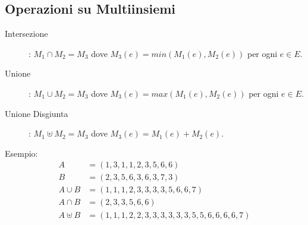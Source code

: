 \subsection{Operazioni su Multiinsiemi}
\begin{description}
    \item[Intersezione]: $M_1 \cap M_2 = M_3$ dove $M_3(e) = min(M_1(e),M_2(e))$ per ogni $e \in E$.
    \item[Unione]: $M_1 \cup M_2 = M_3$ dove $M_3(e) = max(M_1(e),M_2(e))$ per ogni $e \in E$.
    \item[Unione Disgiunta]: $M_1 \uplus M_2 = M_3$ dove $M_3(e) = M_1(e) + M_2(e)$.
\end{description}

Esempio:
\begin{equation*}
\begin{split}
A & = (1,3,1,1,2,3,5,6,6) \\
B & = (2,3,5,6,3,6,3,7,3) \\
A \cup B & = (1,1,1,2,3,3,3,3,5,6,6,7) \\
A \cap B & = (2,3,3,5,6,6) \\
A \uplus B & = (1,1,1,2,2,3,3,3,3,3,3,5,5,6,6,6,6,7)\\
\end{split}
\end{equation*}
